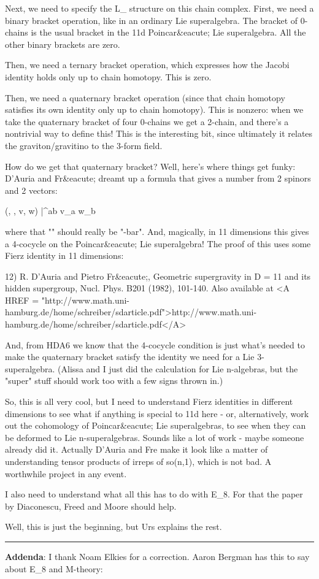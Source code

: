 Next, we need to specify the L_{\infty } structure on this
chain complex.  First, we need a binary bracket operation, 
like in an ordinary Lie superalgebra.
The bracket of 0-chains is the usual bracket in the 11d Poincar&eacute; 
Lie superalgebra.  All the other binary brackets are zero.

Then, we need a ternary bracket operation, which expresses how the
Jacobi identity holds only up to chain homotopy.  This is zero.

Then, we need a quaternary bracket operation (since that
chain homotopy satisfies its own identity only up to chain
homotopy).  This is nonzero: when we take the quaternary
bracket of four 0-chains we get a 2-chain, and there's a
nontrivial way to define this!  This is the interesting bit,
since ultimately it relates the graviton/gravitino to the 
3-form field.

How do we get that quaternary bracket?  Well, here's where
things get funky: D'Auria and Fr&eacute; dreamt up a formula that 
gives a number from 2 spinors and 2 vectors: 

(\psi , \phi , v, w) |\to  \psi * \Gamma ^{ab} \phi  v_{a} w_{b}

where that "\psi *" should really be "\psi -bar".
And, magically, in 11 dimensions this gives a 4-cocycle on 
the Poincar&eacute; Lie superalgebra!  The proof of this uses some
Fierz identity in 11 dimensions:

12) R. D'Auria and Pietro Fr&eacute;, Geometric supergravity in D = 11
and its hidden supergroup, Nucl. Phys. B201 (1982), 101-140.
Also available at <A HREF = "http://www.math.uni-hamburg.de/home/schreiber/sdarticle.pdf">http://www.math.uni-hamburg.de/home/schreiber/sdarticle.pdf</A>

And, from HDA6 we know that the 4-cocycle condition is just 
what's needed to make the quaternary bracket satisfy the identity
we need for a Lie 3-superalgebra.  (Alissa and I just did the
calculation for Lie n-algebras, but the "super" stuff should work
too with a few signs thrown in.)

So, this is all very cool, but I need to understand Fierz identities
in different dimensions to see what if anything is special to
11d here - or, alternatively, work out the cohomology of Poincar&eacute;
Lie superalgebras, to see when they can be deformed to Lie 
n-superalgebras.  Sounds like a lot of work - maybe someone already
did it.  Actually D'Auria and Fre make it look like a matter of
understanding tensor products of irreps of so(n,1), which is not bad.
A worthwhile project in any event.

I also need to understand what all this has to do with E_{8}.
For that the paper by Diaconescu, Freed and Moore should help.

Well, this is just the beginning, but Urs explains the rest.

\par\noindent\rule{\textwidth}{0.4pt}
\textbf{Addenda}: I thank Noam Elkies for a correction.  Aaron
Bergman has this to say about E_{8} and M-theory:



